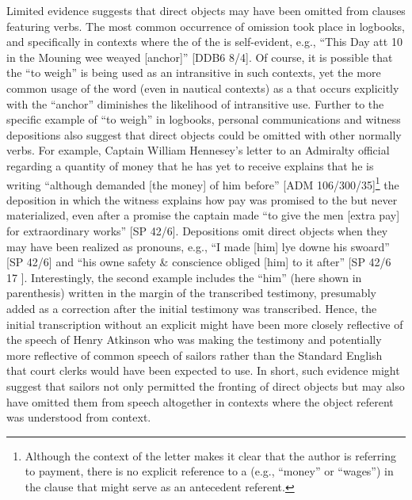Limited evidence suggests that direct objects may have been omitted from clauses featuring  verbs. The most common occurrence of  omission took place in logbooks, and specifically in contexts where the  of the  is self-evident, e.g., “This Day att 10 in the Mouning wee weayed [anchor]” [DDB6 8/4]. Of course, it is possible that the  “to weigh” is being used as an intransitive  in such contexts, yet the more common usage of the word (even in nautical contexts) as a  that occurs explicitly with the  “anchor” diminishes the likelihood of intransitive use. Further to the specific example of “to weigh” in logbooks, personal communications and witness depositions also suggest that direct objects could be omitted with other normally  verbs. For example, Captain William Hennesey’s letter to an Admiralty official regarding a quantity of money that he has yet to receive explains that he is writing “although demanded [the money] of him before” [ADM 106/300/35]\footnote{Although the context of the letter makes it clear that the author is referring to payment, there is no explicit reference to a  (e.g., “money” or “wages”) in the clause that might serve as an antecedent referent.}  the deposition in which the witness explains how pay was promised to the  but never materialized, even after a promise the captain made “to give the men [extra pay] for extraordinary works” [SP 42/6]. Depositions omit direct objects when they may have been realized as pronouns, e.g., “I made [him] lye downe his swoard” [SP 42/6] and “his owne safety \& conscience obliged [him] to it after” [SP 42/6 17 \citealt{Aug1700}]. Interestingly, the second example includes the  “him” (here shown in parenthesis) written in the margin of the transcribed testimony, presumably added as a correction after the initial testimony was transcribed. Hence, the initial transcription without an explicit  might have been more closely reflective of the speech of Henry Atkinson who was making the testimony and potentially more reflective of common speech of sailors rather than the Standard English that court clerks would have been expected to use. In short, such evidence might suggest that sailors not only permitted the fronting of direct objects but may also have omitted them from speech altogether in contexts where the object referent was understood from context.  

